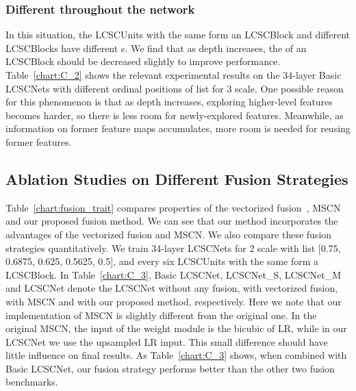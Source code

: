\documentclass[journal]{IEEEtran}
\begin{document}
\subsubsection{Different  throughout the network}   

In this situation, the LCSCUnits with the same  form an LCSCBlock and different LCSCBlocks have different s. We find that as depth increases, the  of an LCSCBlock should be decreased slightly to improve performance. Table~\ref{chart:C_2} shows the relevant experimental results on the 34-layer Basic LCSCNets with different ordinal positions of  list for 3 scale. One possible reason for this phenomenon is that as depth increases, exploring higher-level features becomes harder, so there is less room for newly-explored features. Meanwhile, as information on former feature maps accumulates, more room is needed for reusing former features.  


\subsection{Ablation Studies on Different Fusion Strategies} \label{s:s_5::D}

Table~\ref{chart:fusion_trait} compares properties of the vectorized fusion~\cite{kim2016deeply}, MSCN~\cite{liu2016learning} and our proposed fusion method. We can see that our method incorporates the advantages of the vectorized fusion and MSCN. We also compare these fusion strategies quantitatively. We train 34-layer LCSCNets for 2 scale with  list [0.75, 0.6875, 0.625, 0.5625, 0.5], and every six LCSCUnits with the same  form a LCSCBlock. In Table~\ref{chart:C_3}, Basic LCSCNet, LCSCNet\_S, LCSCNet\_M and LCSCNet denote the LCSCNet without any fusion, with vectorized fusion, with MSCN and with our proposed method, respectively. Here we note that our implementation of MSCN is slightly different from the original one. In the original MSCN, the input of the weight module is the bicubic of LR, while in our LCSCNet we use the upsampled LR input. This small difference should have little influence on final results. As Table~\ref{chart:C_3} shows, when combined with Basic LCSCNet, our fusion strategy performs better than the other two fusion benchmarks. 
\end{document}
